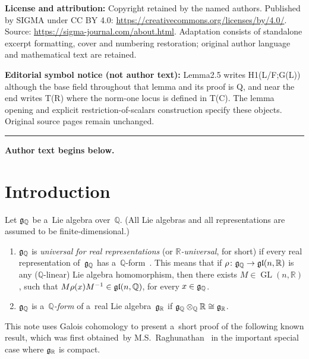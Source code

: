 \documentclass[11pt]{article}
\DeclareMathOperator{\GL}{GL}
\numberwithin{equation}{section}
\newcommand{\Lie}[1]{\mathfrak{\lowercase{#1}}}
\begin{document}
\noindent\textbf{License and attribution:} Copyright retained by the named authors. Published by SIGMA under CC BY 4.0: \url{https://creativecommons.org/licenses/by/4.0/}. Source: \url{https://sigma-journal.com/about.html}. Adaptation consists of standalone excerpt formatting, cover and numbering restoration; original author language and mathematical text are retained.\par
\noindent\textbf{Editorial symbol notice (not author text):} Lemma2.5 writes H1(L/F;G(L)) although the base field throughout that lemma and its proof is Q, and near the end writes T(R) where the norm-one locus is defined in T(C). The lemma opening and explicit restriction-of-scalars construction specify these objects. Original source pages remain unchanged.\par
\medskip\hrule\medskip\noindent\textbf{Author text begins below.}\par
\setcounter{section}{0}
\setcounter{subsection}{0}
\setcounter{subsubsection}{0}
\setcounter{equation}{0}
\section{Introduction}

\begin{defn}
Let $\Lie G_\mathbb{Q}$ be a~Lie algebra over~$\mathbb{Q}$.
(All Lie algebras and all representations are assumed to be f\/inite-dimensional.)
\begin{enumerate}\itemsep=0pt
\item $\Lie G_\mathbb{Q}$ is \emph{universal for real representations} (or \emph{$\mathbb{R}$-universal}, for short) if
every real representation of~$\Lie G_\mathbb{Q}$ has a~$\mathbb{Q}$-form~\cite[Def\/inition~7.1]{Morris-RRepsQForms}.
This means that if $\rho \colon \Lie G_\mathbb{Q} \to \Lie{GL}(n,\mathbb{R})$ is any ($\mathbb{Q}$-linear) Lie algebra
homomorphism, then there exists $M \in \GL(n,\mathbb{R})$, such that $M \rho(x) M^{-1} \in \Lie{GL}(n,\mathbb{Q})$, for
every $x \in \Lie G_\mathbb{Q}$.
\item $\Lie G_\mathbb{Q}$ is a~\emph{$\mathbb{Q}$-form} of a~real Lie algebra~$\Lie G_\mathbb{R}$ if $\Lie G_\mathbb{Q}
\otimes_\mathbb{Q} \mathbb{R} \cong \Lie G_\mathbb{R}$.
\end{enumerate}
\end{defn}

This note uses Galois cohomology to present a~short proof of the following known result, which was f\/irst obtained~by
M.S.~Raghunathan~\cite[\S~3]{Raghunathan-ArithLattsSSGrps} in the important special case where $\Lie G_\mathbb{R}$ is
compact.
\end{document}

